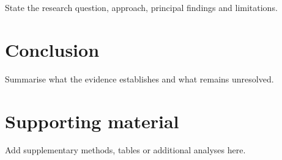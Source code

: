 \documentclass[11pt,a4paper,oneside,openany,BCOR=7mm,DIV=12]{scrbook}
\begin{document}
\frontmatter
\hypersetup{pageanchor=false}
\makethesistitle
\setcounter{page}{1}
\hypersetup{pageanchor=true}
State the research question, approach, principal findings and limitations.
\tableofcontents
\listoffigures
\listoftables

\mainmatter




\chapter{Conclusion}
Summarise what the evidence establishes and what remains unresolved.
% 
% 
\appendix
\chapter{Supporting material}
Add supplementary methods, tables or additional analyses here.
\end{document}
